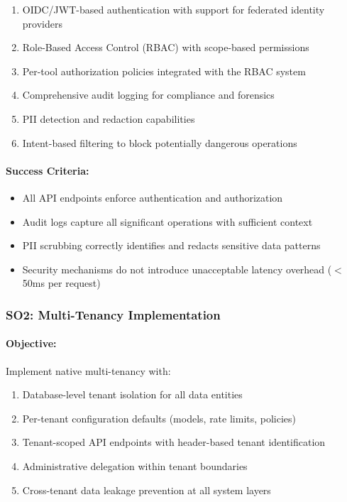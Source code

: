 \documentclass[a4paper,twoside]{sapthesis}
\begin{document}
\begin{enumerate}
    \item OIDC/JWT-based authentication with support for federated identity providers
    \item Role-Based Access Control (RBAC) with scope-based permissions
    \item Per-tool authorization policies integrated with the RBAC system
    \item Comprehensive audit logging for compliance and forensics
    \item PII detection and redaction capabilities
    \item Intent-based filtering to block potentially dangerous operations
\end{enumerate}

\paragraph{Success Criteria:}
\begin{itemize}
    \item All API endpoints enforce authentication and authorization
    \item Audit logs capture all significant operations with sufficient context
    \item PII scrubbing correctly identifies and redacts sensitive data patterns
    \item Security mechanisms do not introduce unacceptable latency overhead ($<$50ms per request)
\end{itemize}

\subsubsection{SO2: Multi-Tenancy Implementation}

\paragraph{Objective:} Implement native multi-tenancy with:

\begin{enumerate}
    \item Database-level tenant isolation for all data entities
    \item Per-tenant configuration defaults (models, rate limits, policies)
    \item Tenant-scoped API endpoints with header-based tenant identification
    \item Administrative delegation within tenant boundaries
    \item Cross-tenant data leakage prevention at all system layers
\end{enumerate}
\end{document}
